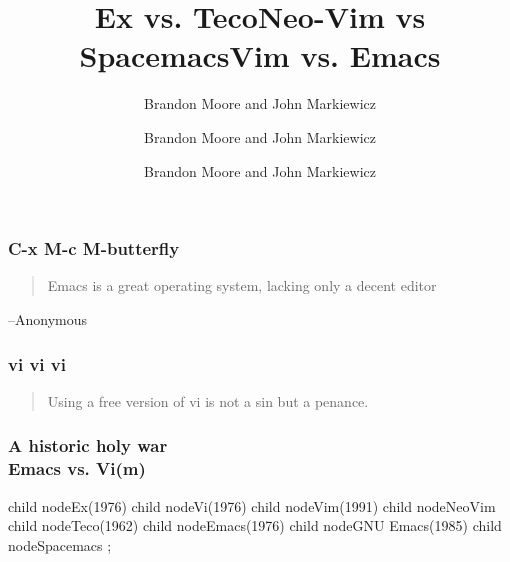 \documentclass[8pt]{beamer}
\begin{document}
\title{Ex vs. Teco}
\author{Brandon Moore and John Markiewicz}
\date{}

\begin{frame}
  \titlepage
\end{frame}

\title{Neo-Vim vs Spacemacs}
\author{Brandon Moore and John Markiewicz}
\date{}

\begin{frame}
  \titlepage
\end{frame}

\title{Vim vs. Emacs}
\author{Brandon Moore and John Markiewicz}
\date{}

\begin{frame}
  \titlepage
\end{frame}

\begin{frame}
  \frametitle{C-x M-c M-butterfly}
  \begin{quote}
    Emacs is a great operating system, lacking only a decent editor
  \end{quote}
        \begin{flushright}
          --Anonymous
        \end{flushright}
\end{frame}

\begin{frame}
  \frametitle{vi vi vi}
  \begin{quote}
    Using a free version of vi is not a sin but a penance.
  \end{quote}
  \begin{flushright}
  \end{flushright}
\end{frame}

\begin{frame}
  \frametitle{A historic holy war\\Emacs vs. Vi(m)}
\begin{tikz}
  [
    grow                    = right,
    sibling distance        = 6em,
    level distance          = 7em,
    edge from parent/.style = {draw, -latex},
    every node/.style       = {font=\footnotesize},
    sloped
  ]
    child {
      node{Ex(1976)}
      child {
        node{Vi(1976)}
        child {
          node{Vim(1991)}
          child {
            node{NeoVim}
          }
        }
      }
    }
    child {
      node{Teco(1962)}
      child {
        node{Emacs(1976)}
        child {
          node{GNU Emacs(1985)}
          child {
            node{Spacemacs}
          }
        }
      }
    };
\end{tikz}
\end{frame}
\end{document}
